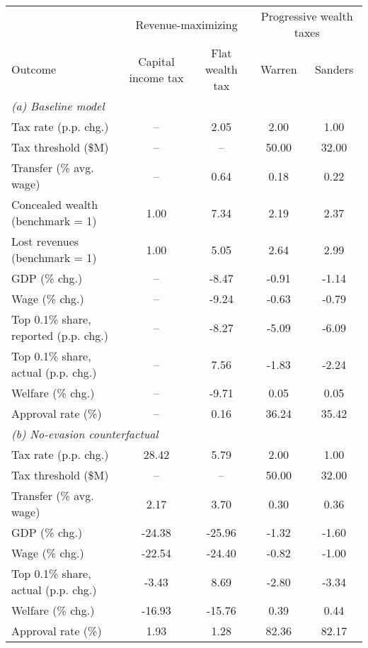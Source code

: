 \footnotesize
\renewcommand{\arraystretch}{1.2}
\begin{tabular}{lcccc}
\toprule
&\multicolumn{2}{c}{Revenue-maximizing} & \multicolumn{2}{c}{Progressive wealth taxes}\\
\cmidrule(rl){2-3}\cmidrule(rl){4-5}
Outcome & Capital income tax & Flat wealth tax & Warren & Sanders\\
\midrule
\multicolumn{5}{l}{\textit{(a) Baseline model}}\\
Tax rate (p.p. chg.)&--&2.05&2.00&1.00\\
Tax threshold (\$M)&--&--&50.00&32.00\\
Transfer (\% avg. wage)&--&0.64&0.18&0.22\\
[1.0ex]Concealed wealth (benchmark = 1)&1.00&7.34&2.19&2.37\\
Lost revenues (benchmark = 1)&1.00&5.05&2.64&2.99\\
[1.0ex]GDP (\% chg.)&--&-8.47&-0.91&-1.14\\
Wage (\% chg.)&--&-9.24&-0.63&-0.79\\
[1.0ex]Top 0.1\% share, reported (p.p. chg.)&--&-8.27&-5.09&-6.09\\
Top 0.1\% share, actual (p.p. chg.)&--&7.56&-1.83&-2.24\\
[1.0ex]Welfare (\% chg.)&--&-9.71&0.05&0.05\\
Approval rate (\%)&--&0.16&36.24&35.42\\
\midrule
\multicolumn{5}{l}{\textit{(b) No-evasion counterfactual}}\\
Tax rate (p.p. chg.)&28.42&5.79&2.00&1.00\\
Tax threshold (\$M)&--&--&50.00&32.00\\
Transfer (\% avg. wage)&2.17&3.70&0.30&0.36\\
[1.0ex]GDP (\% chg.)&-24.38&-25.96&-1.32&-1.60\\
Wage (\% chg.)&-22.54&-24.40&-0.82&-1.00\\
[1.0ex]Top 0.1\% share, actual (p.p. chg.)&-3.43&8.69&-2.80&-3.34\\
[1.0ex]Welfare (\% chg.)&-16.93&-15.76&0.39&0.44\\
Approval rate (\%)&1.93&1.28&82.36&82.17\\
\bottomrule
\end{tabular}
\normalsize
